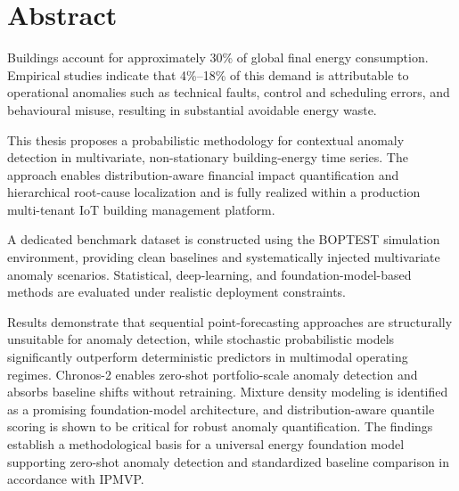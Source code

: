 \chapter*{Abstract}

Buildings account for approximately 30\% of global final energy consumption.
Empirical studies indicate that 4\%–18\% of this demand is attributable to operational
anomalies such as technical faults, control and scheduling errors, and behavioural
misuse, resulting in substantial avoidable energy waste.

This thesis proposes a probabilistic methodology for contextual anomaly detection in
multivariate, non-stationary building-energy time series. The approach enables
distribution-aware financial impact quantification and hierarchical root-cause
localization and is fully realized within a production multi-tenant IoT building
management platform.

A dedicated benchmark dataset is constructed using the BOPTEST simulation environment,
providing clean baselines and systematically injected multivariate anomaly scenarios.
Statistical, deep-learning, and foundation-model-based methods are evaluated under
realistic deployment constraints.

Results demonstrate that sequential point-forecasting approaches are structurally
unsuitable for anomaly detection, while stochastic probabilistic
models significantly outperform deterministic predictors in multimodal operating
regimes. Chronos-2 enables zero-shot portfolio-scale anomaly detection and absorbs
baseline shifts without retraining. Mixture density modeling is identified as a
promising foundation-model architecture, and distribution-aware quantile scoring is
shown to be critical for robust anomaly quantification. The findings establish a methodological
basis for a universal energy foundation model supporting zero-shot anomaly detection
and standardized baseline comparison in accordance with IPMVP.